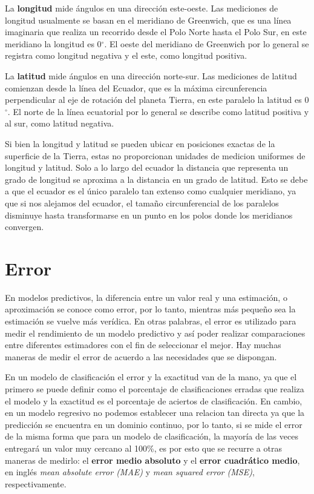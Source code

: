     La \textbf{longitud} mide ángulos en una dirección este-oeste. Las mediciones de longitud usualmente se basan en el meridiano de Greenwich, que es una línea
    imaginaria que realiza un recorrido desde el Polo Norte hasta el Polo Sur, en este meridiano la longitud es 0$^{\circ}$. El oeste del meridiano de Greenwich por lo general 
    se registra como longitud negativa y el este, como longitud positiva.

    La \textbf{latitud} mide ángulos en una dirección norte-sur. Las mediciones de latitud comienzan desde la línea del Ecuador, que es la máxima circunferencia perpendicular
    al eje de rotación del planeta Tierra, en este paralelo la latitud es 0$^{\circ}$. El norte de la línea ecuatorial por lo general 
    se describe como latitud positiva y al sur, como latitud negativa.

    Si bien la longitud y latitud se pueden ubicar en posiciones exactas de la superficie de la Tierra, estas no proporcionan
    unidades de medicion uniformes de longitud y latitud. Solo a lo largo del ecuador la distancia que representa un grado de longitud se aproxima a la distancia
    en un grado de latitud. Esto se debe a que el ecuador es el único paralelo tan extenso como cualquier meridiano, ya que si nos alejamos del ecuador, el tamaño circunferencial de
    los paralelos disminuye hasta transformarse en un punto en los polos donde los meridianos convergen.
%    
%
%
%
\section{Error}
En modelos predictivos, la diferencia entre un valor real y una estimación, o aproximación se conoce como error, por lo tanto, mientras más pequeño sea
la estimación se vuelve más verídica. En otras palabras, el error es utilizado para medir el rendimiento de un modelo predictivo y así poder
realizar comparaciones entre diferentes estimadores con el fin de seleccionar el mejor.
Hay muchas maneras de medir el error de acuerdo a las necesidades que se dispongan.


En un modelo de clasificación el error y la exactitud van de la mano, ya que el primero se puede definir como el porcentaje de clasificaciones erradas que realiza el modelo 
y la exactitud es el porcentaje de aciertos de clasificación.
En cambio, en un modelo regresivo no podemos establecer una relacion tan directa ya que la predicción se encuentra en un dominio continuo, por lo tanto, si se mide el 
error de la misma forma que para un modelo de clasificación, la mayoría de las veces entregará un valor muy cercano al 100\%, es por esto que se recurre a otras maneras de medirlo: 
el \textbf{error medio absoluto} y el \textbf{error cuadrático medio}, en inglés \textit{mean absolute error (MAE)} y \textit{mean squared error (MSE)}, respectivamente.

